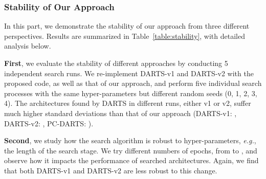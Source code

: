 \documentclass{article} \usepackage{iclr2020_conference,times}
\begin{document}
\begin{table}[!t]
\centering
\small
\caption{Experiments on stability of DARTS and PC-DARTS. Left: Evaluations of searched architectures in five independent search runs. Middle: architectures searched with different numbers of epochs. Right: runs on architectures searched with different numbers of nodes.}
\label{table:stability}
\begin{threeparttable}[b]
\end{threeparttable}
\end{table}

\subsubsection{Stability of Our Approach}

In this part, we demonstrate the stability of our approach from three different perspectives. Results are summarized in Table~\ref{table:stability}, with detailed analysis below.

\textbf{First}, we evaluate the stability of different approaches by conducting 5 independent search runs.  We re-implement DARTS-v1 and DARTS-v2 with the proposed code, as well as that of our approach, and perform five individual search processes with the same hyper-parameters but different random seeds (0, 1, 2, 3, 4). The architectures found by DARTS in different runs, either v1 or v2, suffer much higher standard deviations than that of our approach (DARTS-v1: , DARTS-v2: , PC-DARTS: ).

\textbf{Second}, we study how the search algorithm is robust to hyper-parameters, \textit{e.g.}, the length of the search stage. We try different numbers of epochs, from  to , and observe how it impacts the performance of searched architectures. Again, we find that both DARTS-v1 and DARTS-v2 are less robust to this change.
\end{document}
